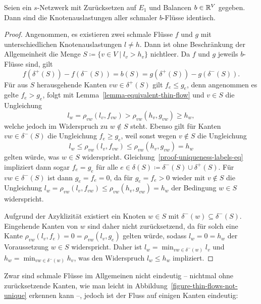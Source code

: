 \begin{lemma}\label{lemma-node-congestion-unique}
	Seien ein $s$-Netzwerk mit Zurücksetzen auf $E_1$ und Balancen $b\in\mathbb{R}^V$ gegeben.
	Dann sind die Knotenauslastungen aller schmaler $b$-Flüsse identisch.
\end{lemma}
\begin{proof}
	Angenommen, es existieren zwei schmale Flüsse $f$ und $g$ mit unterschiedlichen Knotenauslastungen $l\neq h$.
	Dann ist ohne Beschränkung der Allgemeinheit die Menge $S\coloneq \{ v\in V \mid l_v > h_v \}$ nichtleer.
	Da $f$ und $g$ jeweils $b$-Flüsse sind, gilt 
	\begin{equation}\label{proof-uniqueness-labels-eq}
	f( \delta^+(S)) - f(\delta^-(S)) = b(S) = g(\delta^+(S)) - g(\delta^-(S)).
	\end{equation}
	Für aus $S$ herausgehende Kanten $vw\in \delta^+(S)$ gilt $f_e \leq g_e$, denn angenommen es gelte $f_e > g_e$, folgt mit Lemma~\ref{lemma-equivalent-thin-flow} und $v\in S$ die Ungleichung 
	\[l_w = \rho_{vw}(l_v, f_{vw}) > \rho_{vw}(h_v, g_{vw})\geq h_w,\]
	welche jedoch im Widerspruch zu $w\notin S$ steht.
	Ebenso gilt für Kanten $vw\in\delta^-(S)$ die Ungleichung $f_e \geq g_e$, weil sonst wegen $v\notin S$ die Ungleichung
	\[l_w \leq \rho_{vw}(l_v, f_{vw}) \leq \rho_{vw}(h_v, g_{vw}) = h_w\]
	gelten würde, was $w\in S$ widerspricht.
	Gleichung~\ref{proof-uniqueness-labels-eq} impliziert dann sogar $f_e = g_e$ für alle $e\in \delta(S)\coloneq \delta^-(S) \cup \delta^+(S)$.
	Für $vw\in \delta^-(S)$ ist dann $g_e=f_e=0$, da für $g_e=f_e>0$ wieder mit $v\notin S$ die Ungleichung $l_w = \rho_{vw}(l_v, f_{vw})\leq \rho_{vw}(h_v, g_{vw})=h_w$ der Bedingung $w\in S$ widerspricht.
	
	Aufgrund der Azyklizität existiert ein Knoten $w\in S$ mit $\delta^-(w)\subseteq \delta^-(S)$.
	Eingehende Kanten von $w$ sind daher nicht zurücksetzend, da für solch eine Kante $\rho_{vw}(l_v, f_e) = 0 = \rho_{vw}(l_v, g_e)$ gelten würde, sodass $l_w = 0 = h_w$ der Voraussetzung $w\in S$ widerspricht.
	Daher ist $l_w = \min_{vw\in \delta^-(w)} l_v$ und $h_w = \min_{vw\in\delta^-(w)} h_v$, was den Widerspruch $l_w \leq h_w$ impliziert.
\end{proof}

Zwar sind schmale Flüsse im Allgemeinen nicht eindeutig -- nichtmal ohne zurück\-setzende Kanten, wie man leicht in Abbildung~\ref{figure-thin-flows-not-unique} erkennen kann --, jedoch ist der Fluss auf einigen Kanten eindeutig:

